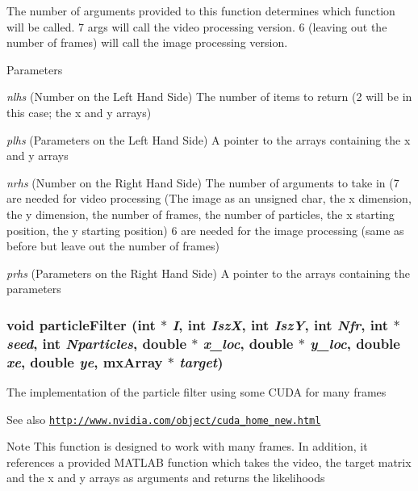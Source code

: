The number of arguments provided to this function determines which function will be called. 7 args will call the video processing version. 6 (leaving out the number of frames) will call the image processing version. 
\begin{DoxyParams}{Parameters}
\item[{\em nlhs}](Number on the Left Hand Side) The number of items to return (2 will be in this case; the x and y arrays) \item[{\em plhs}](Parameters on the Left Hand Side) A pointer to the arrays containing the x and y arrays \item[{\em nrhs}](Number on the Right Hand Side) The number of arguments to take in (7 are needed for video processing (The image as an unsigned char, the x dimension, the y dimension, the number of frames, the number of particles, the x starting position, the y starting position) 6 are needed for the image processing (same as before but leave out the number of frames) \item[{\em prhs}](Parameters on the Right Hand Side) A pointer to the arrays containing the parameters \end{DoxyParams}
\hypertarget{ex__particle__CUDA__naive__full_8cu_af4a42e8ccaa39f6b7e531ce26ef10e85}{
\subsubsection[{particleFilter}]{\setlength{\rightskip}{0pt plus 5cm}void particleFilter (int $\ast$ {\em I}, \/  int {\em IszX}, \/  int {\em IszY}, \/  int {\em Nfr}, \/  int $\ast$ {\em seed}, \/  int {\em Nparticles}, \/  double $\ast$ {\em x\_\-loc}, \/  double $\ast$ {\em y\_\-loc}, \/  double {\em xe}, \/  double {\em ye}, \/  mxArray $\ast$ {\em target})}}
\label{ex__particle__CUDA__naive__full_8cu_af4a42e8ccaa39f6b7e531ce26ef10e85}
The implementation of the particle filter using some CUDA for many frames \begin{DoxySeeAlso}{See also}
\href{http://www.nvidia.com/object/cuda_home_new.html}{\tt http://www.nvidia.com/object/cuda\_\-home\_\-new.html} 
\end{DoxySeeAlso}
\begin{DoxyNote}{Note}
This function is designed to work with many frames. In addition, it references a provided MATLAB function which takes the video, the target matrix and the x and y arrays as arguments and returns the likelihoods 
\end{DoxyNote}

